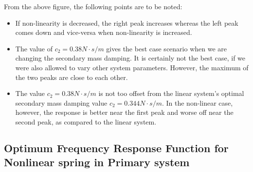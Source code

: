 From the above figure, the following points are to be noted:
\begin{itemize}
\item If non-linearity is decreased, the right peak increases whereas the left peak comes down and vice-versa when non-linearity is increased.

\item The value of $c_{2} = 0.38 N \cdot s/m$ gives the best case scenario when we are changing the secondary mass damping. It is certainly not the best case, if we were also allowed to vary other system parameters. However, the maximum of the two peaks are close to each other.
\item The value $c_{2} = 0.38 N \cdot s/m$ is not too offset from the linear system's optimal secondary mass damping value $c_{2} = 0.344 N \cdot s/m$. In the non-linear case, however, the response is better near the first peak and worse off near the second peak, as compared to the linear system.
\end{itemize}

\subsection{Optimum Frequency Response Function for Nonlinear spring in Primary system}

